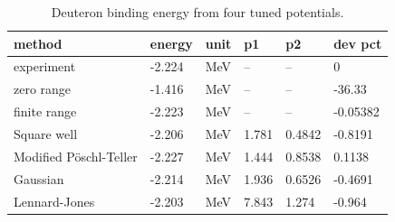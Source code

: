 \begin{table}[htbp]
\centering
\small
\caption{Deuteron binding energy from four tuned potentials.}
\label{tab:deuteron}
\begin{tabular}{llllll}
\hline
method & energy & unit & p1 & p2 & dev pct \\
\hline
experiment & -2.224 & MeV & -- & -- & 0\\
zero range & -1.416 & MeV & -- & -- & -36.33\\
finite range & -2.223 & MeV & -- & -- & -0.05382\\
Square well & -2.206 & MeV & 1.781 & 0.4842 & -0.8191\\
Modified Pöschl-Teller & -2.227 & MeV & 1.444 & 0.8538 & 0.1138\\
Gaussian & -2.214 & MeV & 1.936 & 0.6526 & -0.4691\\
Lennard-Jones & -2.203 & MeV & 7.843 & 1.274 & -0.964 \\
\hline
\end{tabular}
\end{table}
